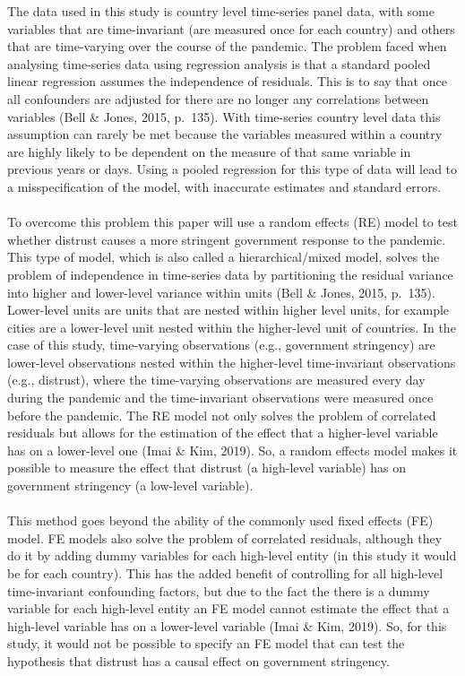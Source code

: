 \documentclass[
  11pt,
]{article}
\begin{document}
The data used in this study is country level time-series panel data, with some variables that are time-invariant (are measured once for each country) and others that are time-varying over the course of the pandemic. The problem faced when analysing time-series data using regression analysis is that a standard pooled linear regression assumes the independence of residuals. This is to say that once all confounders are adjusted for there are no longer any correlations between variables (Bell \& Jones, 2015, p.~135). With time-series country level data this assumption can rarely be met because the variables measured within a country are highly likely to be dependent on the measure of that same variable in previous years or days. Using a pooled regression for this type of data will lead to a misspecification of the model, with inaccurate estimates and standard errors.\\
~\\
To overcome this problem this paper will use a random effects (RE) model to test whether distrust causes a more stringent government response to the pandemic. This type of model, which is also called a hierarchical/mixed model, solves the problem of independence in time-series data by partitioning the residual variance into higher and lower-level variance within units (Bell \& Jones, 2015, p.~135). Lower-level units are units that are nested within higher level units, for example cities are a lower-level unit nested within the higher-level unit of countries. In the case of this study, time-varying observations (e.g., government stringency) are lower-level observations nested within the higher-level time-invariant observations (e.g., distrust), where the time-varying observations are measured every day during the pandemic and the time-invariant observations were measured once before the pandemic. The RE model not only solves the problem of correlated residuals but allows for the estimation of the effect that a higher-level variable has on a lower-level one (Imai \& Kim, 2019). So, a random effects model makes it possible to measure the effect that distrust (a high-level variable) has on government stringency (a low-level variable).\\
~\\
This method goes beyond the ability of the commonly used fixed effects (FE) model. FE models also solve the problem of correlated residuals, although they do it by adding dummy variables for each high-level entity (in this study it would be for each country). This has the added benefit of controlling for all high-level time-invariant confounding factors, but due to the fact the there is a dummy variable for each high-level entity an FE model cannot estimate the effect that a high-level variable has on a lower-level variable (Imai \& Kim, 2019). So, for this study, it would not be possible to specify an FE model that can test the hypothesis that distrust has a causal effect on government stringency.\\
\end{document}
